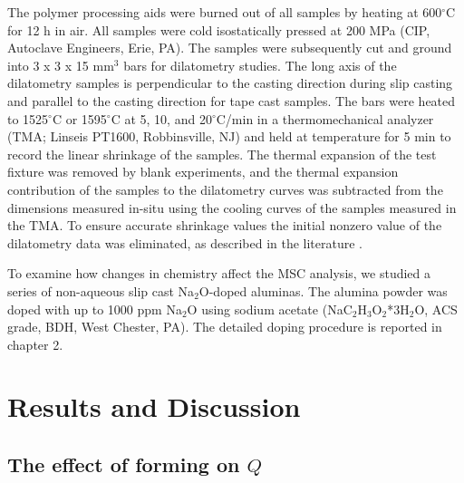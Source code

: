 The polymer processing aids were burned out of all samples by heating at 600$^{\circ}$C for 12 h in air. All samples were cold isostatically pressed at 200 MPa (CIP, Autoclave Engineers, Erie, PA). The samples were subsequently cut and ground into 3 x 3 x 15 mm$^{3}$ bars for dilatometry studies. The long axis of the dilatometry samples is perpendicular to the casting direction during slip casting and parallel to the casting direction for tape cast samples. The bars were heated to 1525$^{\circ}$C or 1595$^{\circ}$C at 5, 10, and 20$^{\circ}$C/min in a thermomechanical analyzer (TMA; Linseis PT1600, Robbinsville, NJ) and held at temperature for 5 min to record the linear shrinkage of the samples. The thermal expansion of the test fixture was removed by blank experiments, and the thermal expansion contribution of the samples to the dilatometry curves was subtracted from the dimensions measured in-situ using the cooling curves of the samples measured in the TMA. To ensure accurate shrinkage values the initial nonzero value of the dilatometry data was eliminated, as described in the literature \cite{Blaine2006}.

To examine how changes in chemistry affect the MSC analysis, we studied a series of non-aqueous slip cast Na$_{2}$O-doped aluminas. The alumina powder was doped with up to 1000 ppm Na$_{2}$O using sodium acetate (NaC$_{2}$H$_{3}$O$_{2}$*3H$_{2}$O, ACS grade, BDH, West Chester, PA). The detailed doping procedure is reported in chapter 2.


\section{Results and Discussion}

\subsection{The effect of forming on $Q$}

